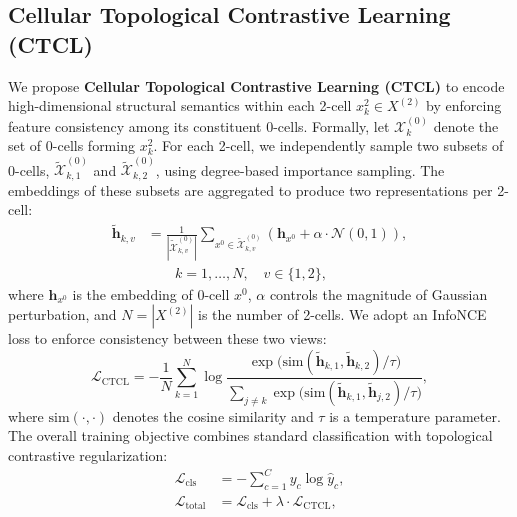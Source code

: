 \subsection{Cellular Topological Contrastive Learning (CTCL)}
We propose \textbf{Cellular Topological Contrastive Learning (CTCL)} to encode high-dimensional structural semantics within each 2-cell $x^2_k \in X^{(2)}$ by enforcing feature consistency among its constituent 0-cells.
Formally, let $\mathcal{X}^{(0)}_k$ denote the set of 0-cells forming $x^2_k$. For each 2-cell, we independently sample two subsets of 0-cells, $\tilde{\mathcal{X}}^{(0)}_{k,1}$ and $\tilde{\mathcal{X}}^{(0)}_{k,2}$, using degree-based importance sampling. The embeddings of these subsets are aggregated to produce two representations per 2-cell:
\begin{equation}
\begin{aligned}
\tilde{\bm{h}}_{k,v}
&= \frac{1}{|\tilde{\mathcal{X}}^{(0)}_{k,v}|}
   \sum_{x^0 \in \tilde{\mathcal{X}}^{(0)}_{k,v}}
   \left( \bm{h}_{x^0} + \alpha \cdot \mathcal{N}(0,1) \right), \\
&\qquad k = 1,\dots,N,\quad v \in \{1,2\},
\end{aligned}
\label{eq:ctcl-representation}
\end{equation}
where $\bm{h}_{x^0}$ is the embedding of 0-cell $x^0$, $\alpha$ controls the magnitude of Gaussian perturbation, and $N = |X^{(2)}|$ is the number of 2-cells. We adopt an InfoNCE loss to enforce consistency between these two views:
\begin{equation}
\mathcal{L}_{\text{CTCL}} = - \frac{1}{N} \sum_{k=1}^{N}
\log \frac{\exp\big(\text{sim}(\tilde{\bm{h}}_{k,1}, \tilde{\bm{h}}_{k,2}) / \tau\big)}
{\sum_{j \neq k} \exp\big(\text{sim}(\tilde{\bm{h}}_{k,1}, \tilde{\bm{h}}_{j,2}) / \tau\big)},
\end{equation}
where $\text{sim}(\cdot,\cdot)$ denotes the cosine similarity and $\tau$ is a temperature parameter. The overall training objective combines standard classification with topological contrastive regularization:
\begin{align}
\mathcal{L}_{\text{cls}} &= - \sum_{c=1}^{C} y_c \log \hat{y}_c, \\
\mathcal{L}_{\text{total}} &= \mathcal{L}_{\text{cls}} + \lambda \cdot \mathcal{L}_{\text{CTCL}},
\end{align}
